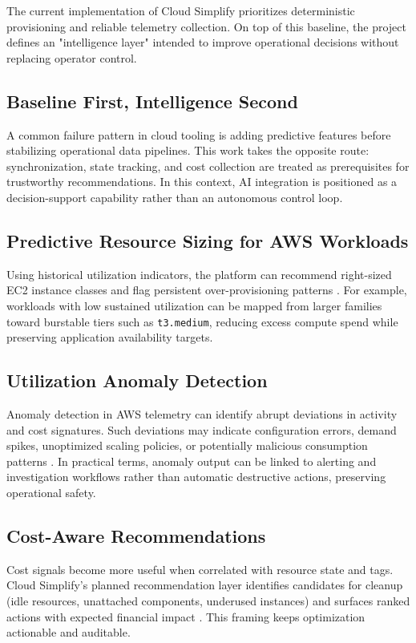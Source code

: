 The current implementation of Cloud Simplify prioritizes deterministic provisioning and reliable telemetry collection. On top of this baseline, the project defines an "intelligence layer" intended to improve operational decisions without replacing operator control.

\subsection{Baseline First, Intelligence Second}
A common failure pattern in cloud tooling is adding predictive features before stabilizing operational data pipelines. This work takes the opposite route: synchronization, state tracking, and cost collection are treated as prerequisites for trustworthy recommendations. In this context, AI integration is positioned as a decision-support capability rather than an autonomous control loop.

\subsection{Predictive Resource Sizing for AWS Workloads}
Using historical utilization indicators, the platform can recommend right-sized EC2 instance classes and flag persistent over-provisioning patterns \cite{researchgate_ml_2025, cost_optim_2025}. For example, workloads with low sustained utilization can be mapped from larger families toward burstable tiers such as \texttt{t3.medium}, reducing excess compute spend while preserving application availability targets.

\subsection{Utilization Anomaly Detection}
Anomaly detection in AWS telemetry can identify abrupt deviations in activity and cost signatures. Such deviations may indicate configuration errors, demand spikes, unoptimized scaling policies, or potentially malicious consumption patterns \cite{ijsat_ai_2024}. In practical terms, anomaly output can be linked to alerting and investigation workflows rather than automatic destructive actions, preserving operational safety.

\subsection{Cost-Aware Recommendations}
Cost signals become more useful when correlated with resource state and tags. Cloud Simplify's planned recommendation layer identifies candidates for cleanup (idle resources, unattached components, underused instances) and surfaces ranked actions with expected financial impact \cite{hashicorp_sentinel_2024}. This framing keeps optimization actionable and auditable.

